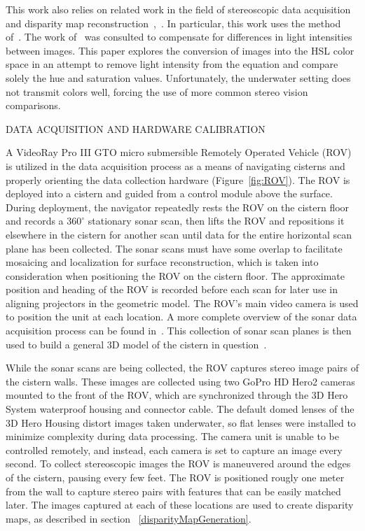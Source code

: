 \documentclass[twocolumn]{article}
\makeatletter
\def\section{\@startsection{section}{1}{\z@}{24pt plus 2 pt
minus 2 pt} {12pt plus 2pt minus 2pt}{\large\bf}}
\makeatother
\begin{document}
This work also relies on related work in the field of stereoscopic data acquisition and disparity map reconstruction~\cite{stereo:gutMarroquin},~\cite{stereo:scharsteinSzeliski}.
In particular, this work uses the method of~\cite{stereo:zitKan}.
The work of~\cite{stereo:nalGast} was consulted to compensate for differences in light intensities between images.
This paper explores the conversion of images into the HSL color space in an attempt to remove light intensity from the equation and compare solely the hue and saturation values.
Unfortunately, the underwater setting does not transmit colors well, forcing the use of more common stereo vision comparisons. 

\section{\uppercase{Data Acquisition and Hardware Calibration}}
\label{sec:data}

A VideoRay Pro III GTO micro submersible Remotely Operated Vehicle (ROV) is utilized in the data acquisition process as a means of navigating cisterns and properly orienting the data collection hardware (Figure~\ref{fig:ROV}). The ROV is deployed into a cistern and guided from a control module above the surface. During deployment, the navigator repeatedly rests the ROV on the cistern floor and records a $360^{\circ}$ stationary sonar scan, then lifts the ROV and repositions it elsewhere in the cistern for another scan until data for the entire horizontal scan plane has been collected. The sonar scans must have some overlap to facilitate mosaicing and localization for surface reconstruction, which is taken into consideration when positioning the ROV on the cistern floor. The approximate position and heading of the ROV is recorded before each scan for later use in aligning projectors in the geometric model. The ROV's main video camera is used to position the unit at each location. A more complete overview of the sonar data acquisition process can be found in~\cite{ClarkVast}. This collection of sonar scan planes is then used to build a general 3D model of the cistern in question~\cite{ICEX11}.

While the sonar scans are being collected, the ROV captures stereo image pairs of the cistern walls. These images are collected using two GoPro HD Hero2 cameras mounted to the front of the ROV, which are synchronized through the 3D Hero System waterproof housing and connector cable. The default domed lenses of the 3D Hero Housing distort images taken underwater, so flat lenses were installed to minimize complexity during data processing. The camera unit is unable to be controlled remotely, and instead, each camera is set to capture an image every second. To collect stereoscopic images the ROV is maneuvered around the edges of the cistern, pausing every few feet. The ROV is positioned rougly one meter from the wall to capture stereo pairs with features that can be easily matched later. The images captured at each of these locations are used to create disparity maps, as described in section ~\ref{disparityMapGeneration}.
\end{document}
